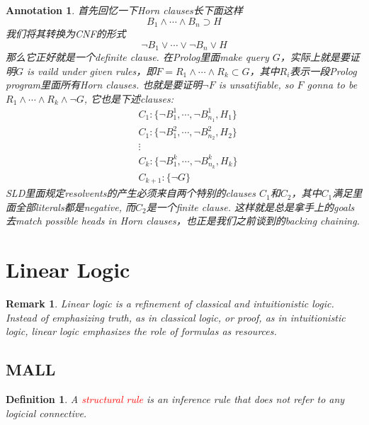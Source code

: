 \documentclass{article}
\theoremstyle{plain}
\newtheorem{definition}[theorem]{Definition}
\newtheorem{remark}[theorem]{Remark}
\newtheorem{annotation}[theorem]{Annotation}
\theoremstyle{nonumberplain}
\newcommand{\redt}[1]{\textcolor{red}{#1}}
\begin{document}
\begin{annotation}
\rm 首先回忆一下Horn clauses长下面这样
\[
	B_1 \wedge \cdots \wedge B_n \supset H
\]
我们将其转换为CNF的形式
\[
	\neg B_1 \vee \cdots \vee \neg B_n \vee H
\]
那么它正好就是一个definite clause. 在Prolog里面make query $G$，实际上就是要证明$G$ is vaild under given rules，即$F = R_1\wedge \cdots \wedge R_k \subset G$，其中$R_i$表示一段Prolog program里面所有Horn clauses. 也就是要证明$\neg F$ is unsatifiable,  so $F$ gonna to be $R_1 \wedge \cdots \wedge R_k \wedge \neg G$, 它也是下述clauses:
\[
	\begin{aligned}
	&C_1:\{\neg B_1^1, \cdots, \neg B_{n_1}^1, H_1\} \\
	&C_1:\{\neg B_1^2, \cdots, \neg B_{n_2}^2, H_2\} \\
	&\vdots \\
	&C_k:\{\neg B_1^k, \cdots, \neg B_{n_k}^k, H_k\} \\
	&C_{k+1}: \{\neg G\}
	\end{aligned}
\]
SLD里面规定resolvents的产生必须来自两个特别的clauses $C_1$和$C_2$，其中$C_1$满足里面全部literals都是negative, 而$C_2$是一个finite clause. 这样就是总是拿手上的goals去match possible heads in Horn clauses，也正是我们之前谈到的backing chaining. 
\end{annotation}


\newpage
\section{Linear Logic}

\begin{remark}
\rm \emph{Linear logic is a refinement of classical and intuitionistic logic. Instead of emphasizing truth, as in classical logic, or proof, as in intuitionistic logic, linear logic emphasizes the role of formulas as resources. }
\end{remark}

\subsection{MALL}
\begin{definition}
\rm A \redt{structural rule} is an inference rule that does not refer to any \emph{logicial connective}. 
\end{definition}
\end{document}
